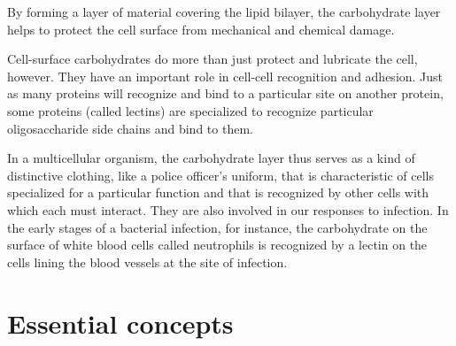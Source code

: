 By forming a layer of material covering the lipid bilayer, the carbohydrate
layer helps to protect the cell surface from mechanical and chemical
damage.

Cell-surface carbohydrates do more than just protect and lubricate the
cell, however. They have an important role in cell-cell recognition and
adhesion. Just as many proteins will recognize and bind to a particular
site on another protein, some proteins (called lectins) are specialized to
recognize particular oligosaccharide side chains and bind to them.

In a multicellular organism, the carbohydrate layer thus serves as a kind
of distinctive clothing, like a police officer’s uniform, that is characteristic
of cells specialized for a particular function and that is recognized
by other cells with which each must interact. They are also involved
in our responses to infection. In the early stages of a bacterial infection,
for instance, the carbohydrate on the surface of white blood cells called
neutrophils is recognized by a lectin on the cells lining the blood vessels
at the site of infection.

\section{Essential concepts}

